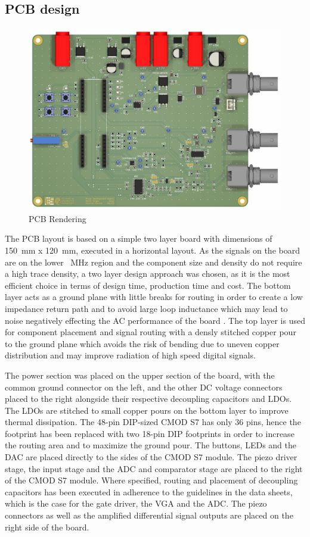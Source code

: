 \documentclass[
	english,
	ruledheaders=section, %
	class=report,%
	thesis={type=Project Seminar Report},%
	accentcolor=TUDa-1d, %
	custommargins=false,%
	marginpar=false,%
	parskip=half-,%
	fontsize=11pt,%
]{tudapub}
\begin{document}
\subsection{PCB design}

\begin{figure}[H]
    \centering
    \includegraphics[width=0.8\columnwidth]{schematics/Piezo_DevBoard1.png}
    \caption{PCB Rendering}
    \label{sch:render}
\end{figure}
The \gls{PCB} layout is based on a simple two layer board with dimensions of \SI{150}{\milli\m} x \SI{120}{\milli\m}, executed in a horizontal layout. As the signals on the board are on the lower \SI{}{\mega\hertz} region and the component size and density do not require a high trace density, a two layer design approach was chosen, as it is the most efficient choice in terms of design time, production time and cost. The bottom layer acts as a ground plane with little breaks for routing in order to create a low impedance return path and to avoid large loop inductance which may lead to noise negatively effecting the AC performance of the board \autocite{mardiguianControllingRadiatedEmissions2014}. The top layer is used for component placement and signal routing with a densly stitched copper pour to the ground plane which avoids the risk of bending due to uneven copper distribution and may improve radiation of high speed digital signals.

The power section was placed on the upper section of the board, with the common ground connector on the left, and the other DC voltage connectors placed to the right alongside their respective decoupling capacitors and \glspl{LDO}. The \glspl{LDO} are stitched to small copper pours on the bottom layer to improve thermal dissipation. The 48-pin \gls{DIP}-sized CMOD S7 has only 36 pins, hence the footprint has been replaced with two 18-pin \gls{DIP} footprints in order to increase the routing area and to maximize the ground pour. The buttons, \glspl{LED} and the \gls{DAC} are placed directly to the sides of the CMOD S7 module. The piezo driver stage, the input stage and the \gls{ADC} and comparator stage are placed to the right of the CMOD S7 module. Where specified, routing and placement of decoupling capacitors has been executed in adherence to the guidelines in the data sheets, which is the case for the gate driver, the \gls{VGA} and the \gls{ADC}. The piezo connectors as well as the amplified differential signal outputs are placed on the right side of the board.
\end{document}
